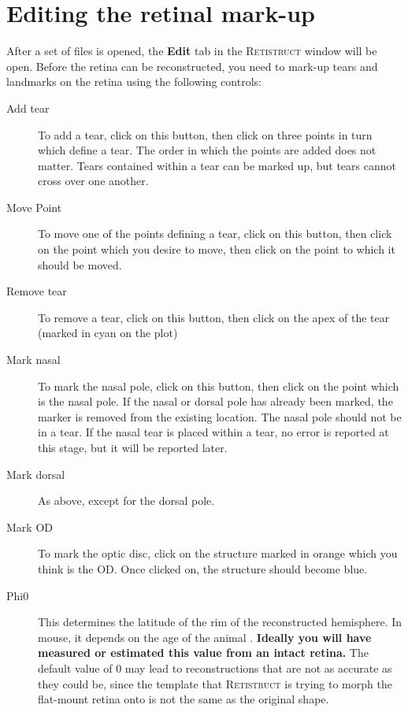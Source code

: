 \documentclass{book}
\begin{document}
\section{Editing the retinal mark-up}
\label{manual:sec:marking-up-retina}

After a set of files is opened, the \textbf{Edit} tab in the
\textsc{Retistruct} window will be open. Before the retina can be
reconstructed, you need to mark-up tears and landmarks on the retina
using the following controls:

\begin{description}
\item[Add tear] To add a tear, click on this button, then click on
  three points in turn which define a tear. The order in which the
  points are added does not matter. Tears contained within a tear can
  be marked up, but tears cannot cross over one another.
\item[Move Point] To move one of the points defining a tear, click on
  this button, then click on the point which you desire to move, then
  click on the point to which it should be moved.
\item[Remove tear] To remove a tear, click on this button, then click
  on the apex of the tear (marked in cyan on the plot)
\item[Mark nasal] To mark the nasal pole, click on this button, then
  click on the point which is the nasal pole.  If the nasal or
  dorsal pole has already been marked, the marker is removed from
  the existing location. The nasal pole should not be in a tear. If
  the nasal tear is placed within a tear, no error is reported at this
  stage, but it will be reported later.
\item[Mark dorsal] As above, except for the dorsal pole.
\item[Mark OD] To mark the optic disc, click on the structure marked
  in orange which you think is the OD. Once clicked on, the structure
  should become blue.
\item[Phi0] This determines the latitude of the rim of the
  reconstructed hemisphere. In mouse, it depends on the age of the
  animal \cite{SterrattEtal2012}.
  \textbf{Ideally you will have measured or estimated this value from
    an intact retina.}
  The default value of 0 may lead to reconstructions that are not as
  accurate as they could be, since the template that
  \textsc{Retistruct} is trying to morph the flat-mount retina onto is
  not the same as the original shape.
\end{description}
\end{document}
